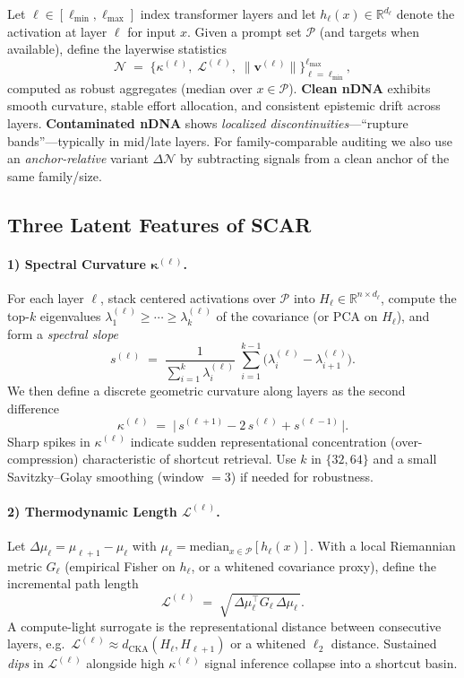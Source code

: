 \documentclass[11pt]{article}
\begin{document}
Let $\ell \in [\ell_{\min}, \ell_{\max}]$ index transformer layers and let $h_\ell(x)\in\mathbb{R}^{d_\ell}$ denote the activation at layer $\ell$ for input $x$. Given a prompt set $\mathcal{P}$ (and targets when available), define the layerwise statistics
\[
\mathcal{N} \;=\; \Big\{\kappa^{(\ell)},\; \mathcal{L}^{(\ell)},\; \|\mathbf{v}^{(\ell)}\|\Big\}_{\ell=\ell_{\min}}^{\ell_{\max}},
\]
computed as robust aggregates (median over $x\in\mathcal{P}$). \textbf{Clean nDNA} exhibits smooth curvature, stable effort allocation, and consistent epistemic drift across layers. \textbf{Contaminated nDNA} shows \emph{localized discontinuities}—``rupture bands''—typically in mid/late layers. For family-comparable auditing we also use an \emph{anchor-relative} variant $\Delta\mathcal{N}$ by subtracting signals from a clean anchor of the same family/size.

\vspace{0.5em}
\subsection{Three Latent Features of SCAR}

\paragraph{1) Spectral Curvature $\boldsymbol{\kappa^{(\ell)}}$.}
For each layer $\ell$, stack centered activations over $\mathcal{P}$ into $H_\ell\in\mathbb{R}^{n\times d_\ell}$, compute the top-$k$ eigenvalues $\lambda^{(\ell)}_1\ge\cdots\ge\lambda^{(\ell)}_k$ of the covariance (or PCA on $H_\ell$), and form a \emph{spectral slope}
\[
s^{(\ell)} \;=\; \frac{1}{\sum_{i=1}^k \lambda^{(\ell)}_i}\;\sum_{i=1}^{k-1}\big(\lambda^{(\ell)}_i-\lambda^{(\ell)}_{i+1}\big).
\]
We then define a discrete geometric curvature along layers as the second difference
\[
\kappa^{(\ell)} \;=\; \big|\, s^{(\ell+1)} - 2\,s^{(\ell)} + s^{(\ell-1)} \,\big|.
\]
Sharp spikes in $\kappa^{(\ell)}$ indicate sudden representational concentration (over-compression) characteristic of shortcut retrieval. Use $k$ in $\{32,64\}$ and a small Savitzky–Golay smoothing (window $=3$) if needed for robustness.

\paragraph{2) Thermodynamic Length $\boldsymbol{\mathcal{L}^{(\ell)}}$.}
Let $\Delta \mu_\ell \!=\! \mu_{\ell+1}\!-\!\mu_\ell$ with $\mu_\ell \!=\! \mathrm{median}_{x\in\mathcal{P}}[h_\ell(x)]$. With a local Riemannian metric $G_\ell$ (empirical Fisher on $h_\ell$, or a whitened covariance proxy), define the incremental path length
\[
\mathcal{L}^{(\ell)} \;=\; \sqrt{\,\Delta \mu_\ell^\top G_\ell\, \Delta \mu_\ell\,}.
\]
A compute-light surrogate is the representational distance between consecutive layers, e.g.\ $\mathcal{L}^{(\ell)} \approx d_{\mathrm{CKA}}(H_\ell,H_{\ell+1})$ or a whitened $\ell_2$ distance. Sustained \emph{dips} in $\mathcal{L}^{(\ell)}$ alongside high $\kappa^{(\ell)}$ signal inference collapse into a shortcut basin.
\end{document}

